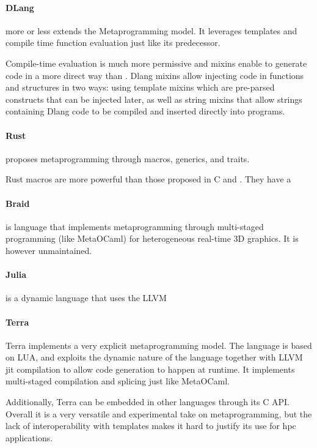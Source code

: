 \documentclass[../main]{subfiles}
\begin{document}
\paragraph{DLang} more or less extends the \cpp Metaprogramming model.
It leverages templates and compile time function evaluation just like
its predecessor.

Compile-time evaluation is much more permissive and mixins enable to generate
code in a more direct way than \cpp. Dlang mixins allow injecting code in
functions and structures in two ways: using template mixins
which are pre-parsed constructs that can be injected later,
as well as string mixins that allow strings containing Dlang code
to be compiled and inserted directly into programs.

\paragraph{Rust} proposes metaprogramming through macros, generics, and traits.

Rust macros are more powerful than those proposed in C and \cpp.
They have a

\paragraph{Braid} \cite{braid} is language that implements metaprogramming
through multi-staged programming (like MetaOCaml) for heterogeneous real-time
3D graphics. It is however unmaintained.

\paragraph{Julia} \cite{julia} is a dynamic language that uses the LLVM

\paragraph{Terra}

Terra\cite{terra} implements a very explicit metaprogramming model.
The language is based on LUA, and exploits the dynamic nature of the language
together with LLVM \gls{jit} compilation to allow code generation
to happen at runtime.
It implements multi-staged compilation and splicing just like MetaOCaml.

Additionally, Terra can be embedded in other languages through its C API.
Overall it is a very versatile and experimental take on metaprogramming,
but the lack of interoperability with \cpp templates makes it hard to justify
its use for \gls{hpc} applications.
\end{document}
